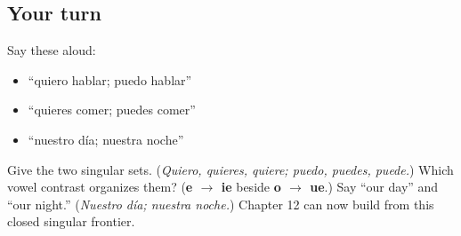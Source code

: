 \subsection*{Your turn}
Say these aloud:

\begin{itemize}
\raggedright
  \item “quiero hablar; puedo hablar”
  \item “quieres comer; puedes comer”
  \item “nuestro día; nuestra noche”
\end{itemize}

\begin{tcolorbox}[breakable,colback=teal!4,colframe=teal!35!black,title={Before you move on}]
Give the two singular sets. (\emph{Quiero, quieres, quiere; puedo, puedes, puede.}) Which vowel contrast organizes them? (\textbf{e $\to$ ie} beside \textbf{o $\to$ ue}.) Say “our day” and “our night.” (\emph{Nuestro día; nuestra noche.}) Chapter 12 can now build from this closed singular frontier.
\end{tcolorbox}
